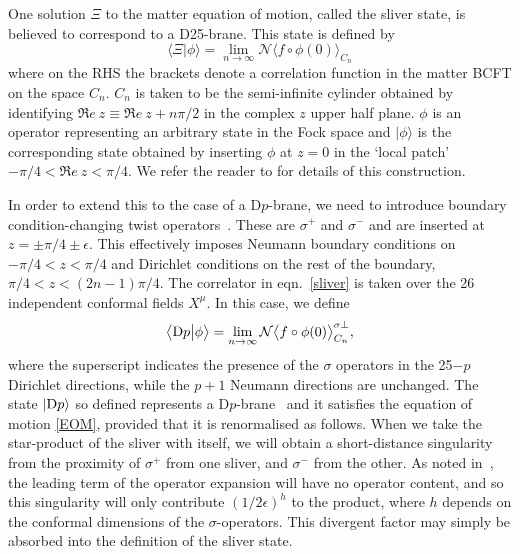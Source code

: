 \documentclass[letterpaper,12pt]{article}
\def\Pcm#1{{\mathcal{#1}}}
\def\er#1{eqn.~\eqref{#1}}
\newcommand{\re}{\Re e \ }
\newcommand{\Dp}{\textup{D}p}
\begin{document}
One solution $\Xi$ to the matter equation of motion, called the sliver state, is believed to 
correspond to a D25-brane. This state is defined by
\begin{equation}
\label{sliver}
\big\langle \Xi \big| \phi \big\rangle = \lim_{n \rightarrow \infty} 
                       \Pcm{N}\big\langle f \circ \phi(0) \big\rangle_{C_n}
\end{equation}
where on the RHS the brackets denote a correlation function in the matter BCFT
on the space $C_n$. $C_n$ is taken to be the semi-infinite cylinder 
obtained by identifying $\re z \equiv \re z + n\pi/2$ in the complex $z$ upper half plane.
$\phi$ is an operator representing an arbitrary state in the Fock space 
and $|\phi\rangle$ is the corresponding state obtained by inserting $\phi$
at $z=0$ in the `local patch' $-\pi/4 < \re z < \pi/4$. We refer the reader to 
\cite{RSZ5} for details of this construction.

In order to extend this to the case of a D$p$-brane, we need to introduce 
boundary condition-changing twist operators~\cite{RSZ4,Muk}. These are
$\sigma^+$ and $\sigma^-$ and are inserted at $z=\pm\pi/4\pm\epsilon$.
This effectively imposes Neumann boundary conditions on $-\pi/4 < z < \pi/4$ and
Dirichlet conditions on the rest of the boundary, $\pi/4 < z < (2n-1)\pi/4$.
The correlator in \er{sliver} is taken over the 26 independent conformal fields
$X^\mu$. In this case, we define
\begin{equation}
\label{dps}
\big\langle \Dp \big| \phi \big\rangle = \lim_{n \rightarrow \infty} 
                       \Pcm{N}\big\langle f \circ \phi(0) \big\rangle^{\sigma \perp}_{C_n}
,\end{equation}
where the superscript indicates the presence of the $\sigma$ operators in the 25$-p$ Dirichlet directions,
while the $p+1$ Neumann directions are unchanged.
The state $|\Dp\rangle$  so defined represents 
a D$p$-brane~\cite{RSZ4} and it satisfies the
equation of motion \eqref{EOM}, provided that it is renormalised as follows.
When we take the star-product of the sliver with itself, we will obtain a 
short-distance singularity from the proximity of $\sigma^+$ from one sliver, and
$\sigma^-$ from the other. As noted in~\cite{RSZ4}, the leading term of the operator 
expansion will have no operator content, and so this singularity will only 
contribute $(1/2\epsilon)^h$ to the product, where $h$ depends on the conformal
dimensions of the $\sigma$-operators. This divergent factor may simply be absorbed
into the definition of the sliver state.
\end{document}
